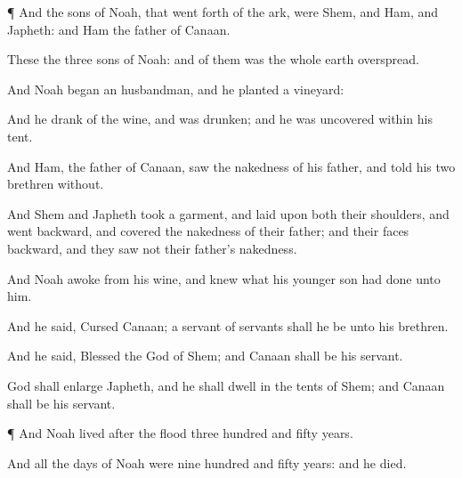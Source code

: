 {\par }{\PP {}¶ And the
sons of
Noah, that went
forth of the
ark, were
Shem, and
Ham, and
Japheth: and
Ham
{} the
father of
Canaan.

These
{} the
three
sons of
Noah: and of them was the whole
earth
overspread.

And
Noah
began
{} an
husbandman, and he
planted a
vineyard:

And he
drank of the
wine, and was
drunken; and he was
uncovered
within his
tent.

And
Ham, the
father of
Canaan,
saw the
nakedness of his
father, and
told his
two
brethren
without.

And
Shem and
Japheth
took a
garment, and
laid
{} upon
both their
shoulders, and
went
backward, and
covered the
nakedness of their
father; and their
faces
{}
backward, and they
saw not their
father’s
nakedness.


\par }{\PP {}And
Noah
awoke from his
wine, and
knew what his
younger
son had
done unto him.

And he
said,
Cursed
{}
Canaan; a
servant of
servants shall he be unto his
brethren.

And he
said,
Blessed
{} the
{}
God of
Shem; and
Canaan shall
be his
servant.

God shall
enlarge
Japheth, and he shall
dwell in the
tents of
Shem; and
Canaan shall be his
servant.


\par }{\PP {}¶ And
Noah
lived
after the
flood
three
hundred and
fifty
years.

And all the
days of
Noah were
nine
hundred and
fifty
years: and he
died.




\par }
